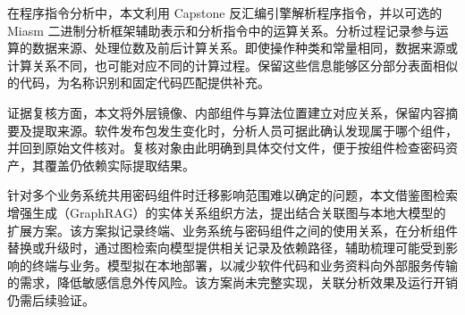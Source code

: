 在程序指令分析中，本文利用 Capstone 反汇编引擎\cite{capstone}解析程序指令，并以可选的 Miasm 二进制分析框架\cite{miasm}辅助表示和分析指令中的运算关系。分析过程记录参与运算的数据来源、处理位数及前后计算关系。即使操作种类和常量相同，数据来源或计算关系不同，也可能对应不同的计算过程。保留这些信息能够区分部分表面相似的代码，为名称识别和固定代码匹配提供补充。

证据复核方面，本文将外层镜像、内部组件与算法位置建立对应关系，保留内容摘要及提取来源。软件发布包发生变化时，分析人员可据此确认发现属于哪个组件，并回到原始文件核对。复核对象由此明确到具体交付文件，便于按组件检查密码资产，其覆盖仍依赖实际提取结果。

针对多个业务系统共用密码组件时迁移影响范围难以确定的问题，本文借鉴图检索增强生成（GraphRAG）\cite{graphrag2024}的实体关系组织方法，提出结合关联图与本地大模型的扩展方案。该方案拟记录终端、业务系统与密码组件之间的使用关系，在分析组件替换或升级时，通过图检索向模型提供相关记录及依赖路径，辅助梳理可能受到影响的终端与业务。模型拟在本地部署，以减少软件代码和业务资料向外部服务传输的需求，降低敏感信息外传风险。该方案尚未完整实现，关联分析效果及运行开销仍需后续验证。
